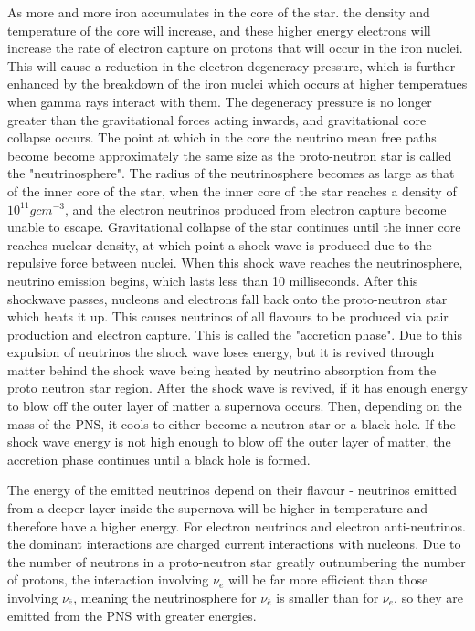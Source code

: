 As more and more iron accumulates in the core of the star. the density and temperature of the core will increase, and these higher energy electrons will increase the rate of electron capture on protons that will occur in the iron nuclei. This will cause a reduction in the electron degeneracy pressure, which is further enhanced by the breakdown of the iron nuclei which occurs at higher temperatues when gamma rays interact with them. The degeneracy pressure is no longer greater than the gravitational forces acting inwards, and gravitational core collapse occurs. The point at which in the core the neutrino mean free paths become become approximately the same size as the proto-neutron star is called the "neutrinosphere".  The radius of the neutrinosphere becomes as large as that of the inner core of the star, when the inner core of the star reaches a density of ~$10^{11} gcm^{-3}$, and the electron neutrinos produced from electron capture become unable to escape. Gravitational collapse of the star continues until the inner core reaches nuclear density, at which point a shock wave is produced due to the repulsive force between nuclei. When this shock wave reaches the neutrinosphere, neutrino emission begins, which lasts less than 10 milliseconds. After this shockwave passes, nucleons and electrons fall back onto the proto-neutron star which heats it up. This causes neutrinos of all flavours to be produced via pair production and electron capture. This is called the "accretion phase". Due to this expulsion of neutrinos the shock wave loses energy, but it is revived through matter behind the shock wave being heated by neutrino absorption from the proto neutron star region. After the shock wave is revived, if it has enough energy to blow off the outer layer of matter a supernova occurs. Then, depending on the mass of the PNS, it cools to either become a neutron star or a black hole. If the shock wave energy is not high enough to blow off the outer layer of matter, the accretion phase continues until a black hole is formed.

The energy of the emitted neutrinos depend on their flavour - neutrinos emitted from a deeper layer inside the supernova will be higher in temperature and therefore have a higher energy. For electron neutrinos and electron anti-neutrinos. the dominant interactions are charged current interactions with nucleons. Due to the number of neutrons in a proto-neutron star greatly outnumbering the number of protons, the interaction involving $\nu_{e}$ will be far more efficient than those involving $\nu_{\bar{e}}$, meaning the neutrinosphere for $\nu_{\bar{e}}$ is smaller than for $\nu_{e}$, so they are emitted from the PNS with greater energies. 

